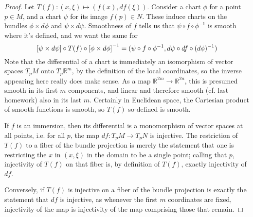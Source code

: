 \documentclass{article}
\begin{document}
\begin{proof}
  Let $T(f): (x, \xi) \mapsto (f(x), df(\xi))$.
  Consider a chart $\phi$ for a point $p \in M$, and a chart $\psi$ for its image $f(p) \in N$.
  These induce charts on the bundles $\phi \times d\phi$ and $\psi \times d\psi$.
  Smoothness of $f$ tells us that $\psi \circ f \circ \phi^{-1}$ is smooth where it's defined,
  and we want the same for
  \[
    \qty[\psi \times d\psi] \circ T(f) \circ \qty[\phi \times d\phi]^{-1}
    = (\psi \circ f \circ \phi^{-1}, d\psi \circ df \circ (d\phi)^{-1})
  \]
  Note that the differential of a chart is immediately an isomorphism of vector spaces $T_{p}M$ onto $T_{p}\mathbb{R}^{m}$,
  by the definition of the local coordinates, so the inverse appearing here really does make sense.
  As a map $\mathbb{R}^{2m} \to \mathbb{R}^{2n}$, this is presumed smooth in its first $m$ components,
  and linear and therefore smooth (cf. last homework) also in its last $m$.
  Certainly in Euclidean space, the Cartesian product of smooth functions is smooth, so $T(f)$ so-defined is smooth.

  If $f$ is an immersion, then its differential is a monomorphism of vector spaces at all points,
  i.e. for all $p$, the map $df: T_{p}M \to T_{p}N$ is injective.
  The restriction of $T(f)$ to a fiber of the bundle projection is merely the statement
  that one is restricting the $x$ in $(x, \xi)$ in the domain to be a single point; calling that $p$,
  injectivity of $T(f)$ on that fiber is, by definition of $T(f)$, exactly injectivity of $df$.

  Conversely, if $T(f)$ is injective on a fiber of the bundle projection is exactly the statement that $df$ is injective,
  as whenever the first $m$ coordinates are fixed, injectivity of the map is injectivity of the map comprising those that remain.

\end{proof}
\end{document}

